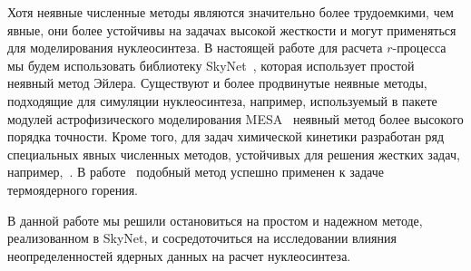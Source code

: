 Хотя неявные численные методы являются значительно более трудоемкими, чем явные, они более устойчивы на задачах высокой жесткости и могут применяться для моделирования нуклеосинтеза. В настоящей работе для расчета $r$-процесса мы будем использовать библиотеку SkyNet~\cite{lippuner2017}, которая использует простой неявный метод Эйлера. Существуют и более продвинутые неявные методы, подходящие для симуляции нуклеосинтеза, например, используемый в пакете модулей астрофизического моделирования MESA~\cite{paxton2011} неявный метод более высокого порядка точности. Кроме того, для задач химической кинетики разработан ряд специальных явных численных методов, устойчивых для решения жестких задач, например,~\cite{bulatov2018}. В работе~\cite{guidry2013} подобный метод успешно применен к задаче термоядерного горения.

В данной работе мы решили остановиться на простом и надежном методе, реализованном в SkyNet, и сосредоточиться на исследовании влияния неопределенностей ядерных данных на расчет нуклеосинтеза.

